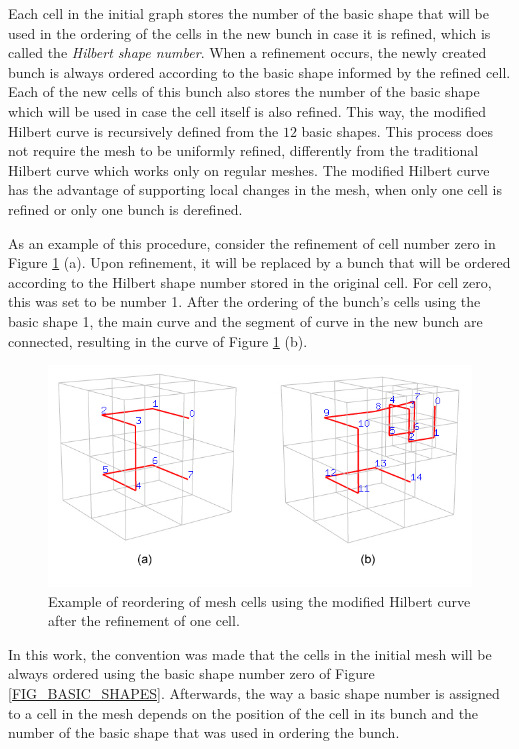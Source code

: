 Each cell in the initial graph stores the number of the basic shape
that will be used in the ordering of the cells in the new bunch in
case it is refined, which is called the \textit{Hilbert shape
number}. When a refinement occurs, the newly created bunch is always
ordered according to the basic shape informed by the refined cell.
Each of the new cells of this bunch also stores the number of the
basic shape which will be used in case the cell itself is also
refined. This way, the modified Hilbert curve is recursively defined
from the $12$ basic shapes. This process does not require the mesh
to be uniformly refined, differently from the traditional Hilbert
curve which works only on regular meshes. The modified Hilbert curve
has the advantage of supporting local changes in the mesh, when only
one cell is refined or only one bunch is derefined.

As an example of this procedure, consider the refinement of cell
number zero in Figure \ref{FIG_INITIAL_HILBERT_CURVE} (a). Upon
refinement, it will be replaced by a bunch that will be ordered
according to the Hilbert shape number stored in the original cell.
For cell zero, this was set to be number 1. After the ordering of
the bunch's cells using the basic shape 1, the main curve and the
segment of curve in the new bunch are connected, resulting in the
curve of Figure \ref{FIG_INITIAL_HILBERT_CURVE} (b).

\begin{figure}[H]
    \centering
    \includegraphics[scale=0.38,angle=0]{../img/initialHilbertCurve.jpg}
    \caption{Example of reordering of mesh cells using the modified Hilbert curve after the refinement of one cell.}
    \label{FIG_INITIAL_HILBERT_CURVE}
\end{figure}

In this work, the convention was made that the cells in the initial
mesh will be always ordered using the basic shape number zero of
Figure \ref{FIG_BASIC_SHAPES}. Afterwards, the way a basic shape
number is assigned to a cell in the mesh depends on the position of
the cell in its bunch and the number of the basic shape that was
used in ordering the bunch.


